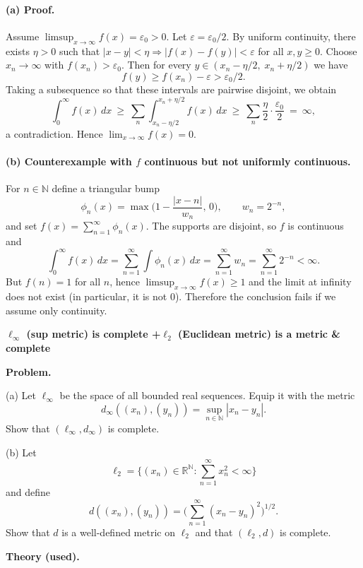 \documentclass[12pt,a4paper]{article}
\begin{document}
\paragraph{(a) Proof.}
Assume $\limsup_{x\to\infty} f(x)=\varepsilon_0>0$. Let $\varepsilon=\varepsilon_0/2$.
By uniform continuity, there exists $\eta>0$ such that
$|x-y|<\eta \Rightarrow |f(x)-f(y)|<\varepsilon$ for all $x,y\ge0$.
Choose $x_n\to\infty$ with $f(x_n)>\varepsilon_0$. Then for every
$y\in (x_n-\eta/2,\;x_n+\eta/2)$ we have
\[
f(y)\ge f(x_n)-\varepsilon>\varepsilon_0/2.
\]
Taking a subsequence so that these intervals are pairwise disjoint, we obtain
\[
\int_0^\infty f(x)\,dx
\ \ge\ \sum_n \int_{x_n-\eta/2}^{x_n+\eta/2} f(x)\,dx
\ \ge\ \sum_n \frac{\eta}{2}\cdot \frac{\varepsilon_0}{2}
\ =\ \infty,
\]
a contradiction. Hence $\lim_{x\to\infty} f(x)=0$.

\paragraph{(b) Counterexample with $f$ continuous but not uniformly continuous.}
For $n\in\mathbb{N}$ define a triangular bump
\[
\phi_n(x)=\max\!\Big(1-\frac{|x-n|}{w_n},\,0\Big),\qquad w_n=2^{-n},
\]
and set $f(x)=\sum_{n=1}^\infty \phi_n(x)$. The supports are disjoint, so $f$ is continuous and
\[
\int_0^\infty f(x)\,dx=\sum_{n=1}^\infty \int \phi_n(x)\,dx
=\sum_{n=1}^\infty w_n=\sum_{n=1}^\infty 2^{-n}<\infty.
\]
But $f(n)=1$ for all $n$, hence $\limsup_{x\to\infty} f(x)\ge 1$ and the limit at infinity does not exist (in particular, it is not $0$).
Therefore the conclusion fails if we assume only continuity.

\begin{center}\Large\bfseries $\ell_\infty$ (sup metric) is complete \quad+\quad $\ell_2$ (Euclidean metric) is a metric \& complete\end{center}

\textbf{Problem.}

(a) Let $\ell_\infty$ be the space of all bounded real sequences.
Equip it with the metric
\[
d_\infty((x_n),(y_n))=\sup_{n\in\mathbb N}|x_n-y_n|.
\]
Show that $(\ell_\infty,d_\infty)$ is complete.

\medskip
(b) Let
\[
\ell_2=\Big\{(x_n)\in\mathbb R^{\mathbb N}:\sum_{n=1}^\infty x_n^2<\infty\Big\}
\]
and define
\[
d((x_n),(y_n))=\Big(\sum_{n=1}^\infty (x_n-y_n)^2\Big)^{1/2}.
\]
Show that $d$ is a well-defined metric on $\ell_2$ and that $(\ell_2,d)$ is complete.

\medskip\medskip
\textbf{Theory (used).}
\end{document}

